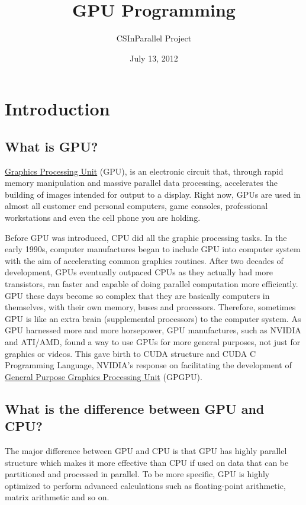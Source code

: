\documentclass[letterpaper,10pt,openany,oneside]{sphinxmanual}
\title{GPU Programming}
\date{July 13, 2012}
\author{CSInParallel Project}
\begin{document}
\maketitle
\tableofcontents
{}\label{index::doc}



\chapter{Introduction}
\label{Introduction/Introduction:introduction}\label{Introduction/Introduction:gpu-programming}\label{Introduction/Introduction::doc}

\section{What is GPU?}
\label{Introduction/Introduction:what-is-gpu}
\href{http://en.wikipedia.org/wiki/GPU}{Graphics Processing Unit} (GPU), is an electronic circuit that, through rapid memory manipulation and massive parallel data processing, accelerates the building of images intended for output to a display. Right now, GPUs are used in almost all customer end personal computers, game consoles, professional workstations and even the cell phone you are holding.

Before GPU was introduced, CPU did all the graphic processing tasks. In the early 1990s, computer manufactures began to include GPU into computer system with the aim of accelerating common graphics routines. After two decades of development, GPUs eventually outpaced CPUs as they actually had more transistors, ran faster and capable of doing parallel computation more efficiently. GPU these days become so complex that they are basically computers in themselves, with their own memory, buses and processors. Therefore, sometimes GPU is like an extra brain (supplemental processors) to the computer system. As GPU harnessed more and more horsepower, GPU manufactures, such as NVIDIA and ATI/AMD, found a way to use GPUs  for more general purposes, not just for graphics or videos. This gave birth to CUDA structure and CUDA C Programming Language, NVIDIA's response on facilitating the development of \href{http://en.wikipedia.org/wiki/GPGPU}{General Purpose Graphics Processing Unit} (GPGPU).


\section{What is the difference between GPU and CPU?}
\label{Introduction/Introduction:general-purpose-graphics-processing-unit}\label{Introduction/Introduction:what-is-the-difference-between-gpu-and-cpu}
The major difference between GPU and CPU is that GPU has highly parallel structure which makes it more effective than CPU if used on data that can be partitioned and processed in parallel. To be more specific, GPU is highly optimized to perform advanced calculations such as floating-point arithmetic, matrix arithmetic and so on.
\end{document}
